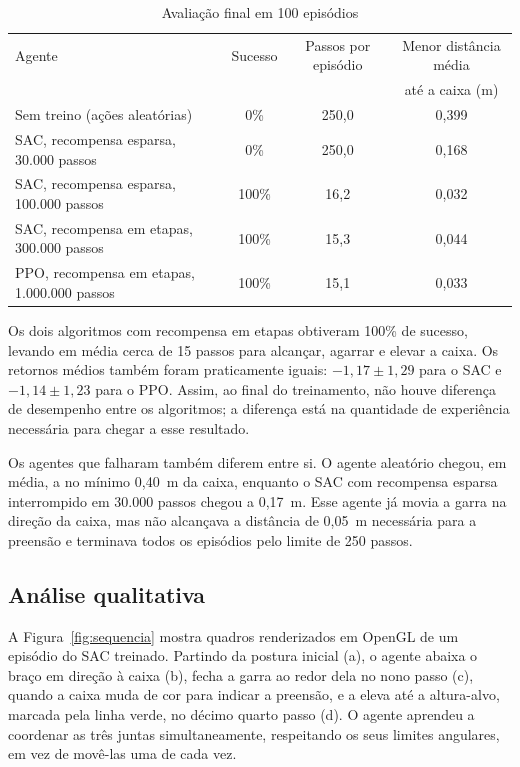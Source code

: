 \begin{table}[htb]
    \centering
    \caption{Avaliação final em 100 episódios}
    \label{tab:final}
    \begin{tabular}{lccc}
        \hline
        Agente & Sucesso & Passos por episódio & Menor distância média \\
               &         &                     & até a caixa (m) \\
        \hline
        Sem treino (ações aleatórias)            & 0\%   & 250,0 & 0,399 \\
        SAC, recompensa esparsa, 30.000 passos   & 0\%   & 250,0 & 0,168 \\
        SAC, recompensa esparsa, 100.000 passos  & 100\% & 16,2  & 0,032 \\
        SAC, recompensa em etapas, 300.000 passos & 100\% & 15,3  & 0,044 \\
        PPO, recompensa em etapas, 1.000.000 passos & 100\% & 15,1  & 0,033 \\
        \hline
    \end{tabular}
\end{table}

Os dois algoritmos com recompensa em etapas obtiveram 100\% de sucesso, levando em média cerca de 15 passos para alcançar, agarrar e elevar a caixa. Os retornos médios também foram praticamente iguais: $-1{,}17 \pm 1{,}29$ para o SAC e $-1{,}14 \pm 1{,}23$ para o PPO. Assim, ao final do treinamento, não houve diferença de desempenho entre os algoritmos; a diferença está na quantidade de experiência necessária para chegar a esse resultado.

Os agentes que falharam também diferem entre si. O agente aleatório chegou, em média, a no mínimo 0,40~m da caixa, enquanto o SAC com recompensa esparsa interrompido em 30.000 passos chegou a 0,17~m. Esse agente já movia a garra na direção da caixa, mas não alcançava a distância de 0,05~m necessária para a preensão e terminava todos os episódios pelo limite de 250 passos.

\subsection{Análise qualitativa}

A Figura~\ref{fig:sequencia} mostra quadros renderizados em OpenGL de um episódio do SAC treinado. Partindo da postura inicial (a), o agente abaixa o braço em direção à caixa (b), fecha a garra ao redor dela no nono passo (c), quando a caixa muda de cor para indicar a preensão, e a eleva até a altura-alvo, marcada pela linha verde, no décimo quarto passo (d). O agente aprendeu a coordenar as três juntas simultaneamente, respeitando os seus limites angulares, em vez de movê-las uma de cada vez.

